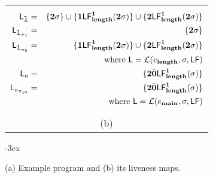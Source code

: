 \begin{figure}[t!]
\begin{tabular}{@{}c@{}}
\begin{minipage}{.51\textwidth}
      \small
\begin{eqnarray*}
 \Lv_{\xl} &=& \{\clazy\sigma\} \cup \{\acdr\Lf{\length}{\acdr}{\clazy\sigma}\} \cup \{\clazy\Lf{\length}{\acdr}{\clazy\sigma}\}\\
 \Lv_{\xl_{\pi_1}} &=& \{\clazy\sigma\} \\
 \Lv_{\xl_{\pi_5}} &=&  \{\acdr\Lf{\length}{\acdr}{\clazy\sigma}\} \cup \{\clazy\Lf{\length}{\acdr}{\clazy\sigma}\} \\
  &&     \mbox{where } \Lv = \mathcal{L}(e_{\length},\sigma,\Lfonly) \\
 \Lv_a &=& \{\clazy\bcar\Lf{\length}{\acdr}{\sigma}\}\\
\Lv_{a_{\pi_{10}}} &=&  \{\clazy\bcar\Lf{\length}{\acdr}{\sigma}\}\\
 &&       \mbox{where }  \Lv =  \mathcal{L}(e_{\main},\sigma,\Lfonly) 
\end{eqnarray*}
    \end{minipage} \\
(b)
  \end{tabular}
\kern -3ex
\caption{(a) Example program and (b) its liveness
maps.}\label{fig:mot-example2}
\end{figure}

